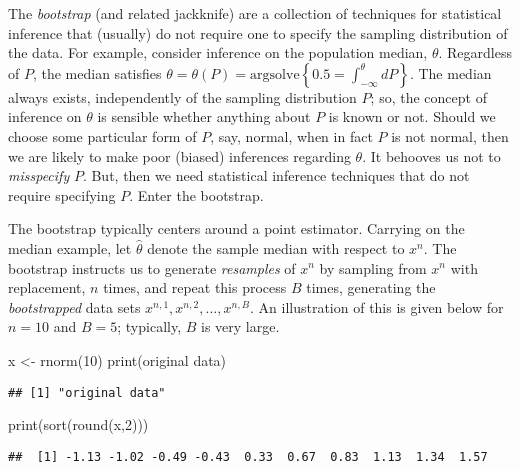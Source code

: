 \documentclass[
]{book}
\newenvironment{Shaded}{\begin{snugshade}}{\end{snugshade}}
\newcommand{\DecValTok}[1]{\textcolor[rgb]{0.00,0.00,0.81}{#1}}
\newcommand{\FunctionTok}[1]{\textcolor[rgb]{0.00,0.00,0.00}{#1}}
\newcommand{\NormalTok}[1]{#1}
\newcommand{\OtherTok}[1]{\textcolor[rgb]{0.56,0.35,0.01}{#1}}
\newcommand{\StringTok}[1]{\textcolor[rgb]{0.31,0.60,0.02}{#1}}
\theoremstyle{definition}
\theoremstyle{definition}
\theoremstyle{definition}
\theoremstyle{definition}
\theoremstyle{remark}
\begin{document}
The \emph{bootstrap} (and related jackknife) are a collection of techniques for statistical inference that (usually) do not require one to specify the sampling distribution of the data. For example, consider inference on the population median, \(\theta\). Regardless of \(P\), the median satisfies \(\theta = \theta(P) = \text{argsolve}\left\{0.5=\int_{-\infty}^\theta dP\right\}\). The median always exists, independently of the sampling distribution \(P\); so, the concept of inference on \(\theta\) is sensible whether anything about \(P\) is known or not. Should we choose some particular form of \(P\), say, normal, when in fact \(P\) is not normal, then we are likely to make poor (biased) inferences regarding \(\theta\). It behooves us not to \emph{misspecify} \(P\). But, then we need statistical inference techniques that do not require specifying \(P\). Enter the bootstrap.

The bootstrap typically centers around a point estimator. Carrying on the median example, let \(\hat\theta\) denote the sample median with respect to \(x^n\). The bootstrap instructs us to generate \emph{resamples} of \(x^n\) by sampling from \(x^n\) with replacement, \(n\) times, and repeat this process \(B\) times, generating the \emph{bootstrapped} data sets \(x^{n,1}, x^{n,2}, \ldots, x^{n,B}\). An illustration of this is given below for \(n=10\) and \(B = 5\); typically, \(B\) is very large.

\begin{Shaded}
\begin{Highlighting}[]
\NormalTok{x }\OtherTok{\textless{}{-}} \FunctionTok{rnorm}\NormalTok{(}\DecValTok{10}\NormalTok{)}
\FunctionTok{print}\NormalTok{(}\StringTok{\textquotesingle{}original data\textquotesingle{}}\NormalTok{)}
\end{Highlighting}
\end{Shaded}

\begin{verbatim}
## [1] "original data"
\end{verbatim}

\begin{Shaded}
\begin{Highlighting}[]
\FunctionTok{print}\NormalTok{(}\FunctionTok{sort}\NormalTok{(}\FunctionTok{round}\NormalTok{(x,}\DecValTok{2}\NormalTok{)))}
\end{Highlighting}
\end{Shaded}

\begin{verbatim}
##  [1] -1.13 -1.02 -0.49 -0.43  0.33  0.67  0.83  1.13  1.34  1.57
\end{verbatim}
\end{document}
